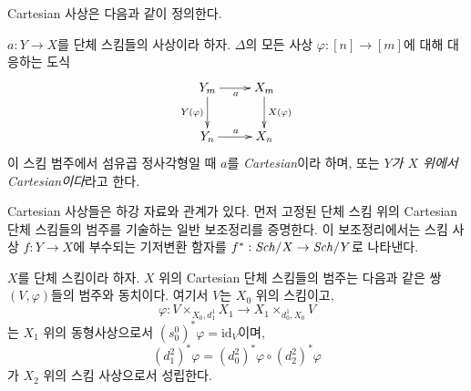 \noindent
Cartesian 사상은 다음과 같이 정의한다.

\begin{definition}
\label{definition-cartesian-morphism}
$a : Y \to X$를 단체 스킴들의 사상이라 하자.
$\Delta$의 모든 사상 $\varphi : [n] \to [m]$에 대해 대응하는 도식
$$
\xymatrix{
Y_m \ar[r]_a \ar[d]_{Y(\varphi)} & X_m \ar[d]^{X(\varphi)}\\
Y_n \ar[r]^{a} & X_n
}
$$
이 스킴 범주에서 섬유곱 정사각형일 때 $a$를 {\it Cartesian}이라 하며,
또는 {\it $Y$가 $X$ 위에서 Cartesian이다}라고 한다.
\end{definition}

\noindent
Cartesian 사상들은 하강 자료와 관계가 있다. 먼저 고정된 단체 스킴 위의
Cartesian 단체 스킴들의 범주를 기술하는 일반 보조정리를 증명한다.
이 보조정리에서는 스킴 사상 $f :Y \to X$에 부수되는 기저변환 함자를
$f^* : \mathit{Sch}/X \to \mathit{Sch}/Y$로 나타낸다.

\begin{lemma}
\label{lemma-characterize-cartesian-schemes}
$X$를 단체 스킴이라 하자. $X$ 위의 Cartesian 단체 스킴들의 범주는
다음과 같은 쌍 $(V, \varphi)$들의 범주와 동치이다. 여기서 $V$는
$X_0$ 위의 스킴이고,
$$
\varphi :
V \times_{X_0, d^1_1} X_1
\longrightarrow
X_1 \times_{d^1_0, X_0} V
$$
는 $X_1$ 위의 동형사상으로서
$(s_0^0)^*\varphi = \text{id}_V$이며,
$$
(d^2_1)^*\varphi = (d^2_0)^*\varphi \circ (d^2_2)^*\varphi
$$
가 $X_2$ 위의 스킴 사상으로서 성립한다.
\end{lemma}

